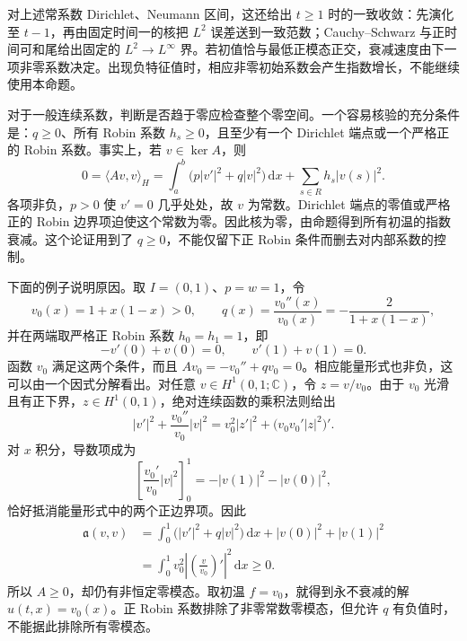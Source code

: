 对上述常系数 Dirichlet、Neumann 区间，这还给出 \(t\geq1\) 时的一致收敛：先演化至 \(t-1\)，再由固定时间一的核把 \(L^2\) 误差送到一致范数；Cauchy--Schwarz 与正时间可和尾给出固定的 \(L^2\to L^\infty\) 界。若初值恰与最低正模态正交，衰减速度由下一项非零系数决定。出现负特征值时，相应非零初始系数会产生指数增长，不能继续使用本命题。

\ProseParagraphBreak

对于一般连续系数，判断是否趋于零应检查整个零空间。一个容易核验的充分条件是：\(q\geq0\)、所有 Robin 系数 \(h_s\geq0\)，且至少有一个 Dirichlet 端点或一个严格正的 Robin 系数。事实上，若 \(v\in\ker A\)，则
\[
 0=\langle Av,v\rangle_H
  =\int_a^b\bigl(p|v'|^2+q|v|^2\bigr)\,\mathrm{d}x
    +\sum_{s\in R}h_s|v(s)|^2.
\]
各项非负，\(p>0\) 使 \(v'=0\) 几乎处处，故 \(v\) 为常数。Dirichlet 端点的零值或严格正的 Robin 边界项迫使这个常数为零。因此核为零，由命题得到所有初温的指数衰减。这个论证用到了 \(q\geq0\)，不能仅留下正 Robin 条件而删去对内部系数的控制。

下面的例子说明原因。取 \(I=(0,1)\)、\(p=w=1\)，令
\[
 v_0(x)=1+x(1-x)>0,\qquad
 q(x)=\frac{v_0''(x)}{v_0(x)}=-\frac2{1+x(1-x)},
\]
并在两端取严格正 Robin 系数 \(h_0=h_1=1\)，即
\[
 -v'(0)+v(0)=0,\qquad v'(1)+v(1)=0.
\]
函数 \(v_0\) 满足这两个条件，而且 \(Av_0=-v_0''+qv_0=0\)。相应能量形式也非负，这可以由一个因式分解看出。对任意 \(v\in H^1(0,1;\mathbb C)\)，令 \(z=v/v_0\)。由于 \(v_0\) 光滑且有正下界，\(z\in H^1(0,1)\)，绝对连续函数的乘积法则给出
\[
 |v'|^2+\frac{v_0''}{v_0}|v|^2
 =v_0^2|z'|^2+\bigl(v_0v_0'|z|^2\bigr)'.
\]
对 \(x\) 积分，导数项成为
\[
 \left[\frac{v_0'}{v_0}|v|^2\right]_0^1
 =-|v(1)|^2-|v(0)|^2,
\]
恰好抵消能量形式中的两个正边界项。因此
\begin{equation}\label{b2:eq:12-robin-zero-mode-factorization}
 \begin{aligned}
 \mathfrak a(v,v)
 &=\int_0^1\bigl(|v'|^2+q|v|^2\bigr)\,\mathrm{d}x
       +|v(0)|^2+|v(1)|^2\\
 &=\int_0^1v_0^2\left|\left(\frac v{v_0}\right)'\right|^2\,\mathrm{d}x
 \geq0.
 \end{aligned}
\end{equation}
所以 \(A\geq0\)，却仍有非恒定零模态。取初温 \(f=v_0\)，就得到永不衰减的解 \(u(t,x)=v_0(x)\)。正 Robin 系数排除了非零常数零模态，但允许 \(q\) 有负值时，不能据此排除所有零模态。

\ProseParagraphBreak

